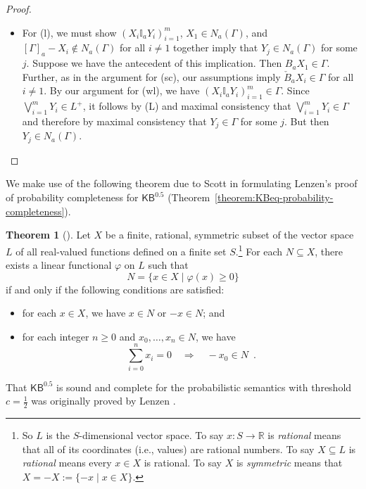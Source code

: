 \documentclass[12pt]{article}
\theoremstyle{definition}
\newtheorem{theorem}{Theorem}[section]
\newcommand{\KBeq}{{\mathsf{KB}^{\mathsf{0.5}}}}       %
\begin{document}
\begin{proof}
\begin{itemize}
  \item For (l), we must show $(X_i\mathbb{I}_aY_i)_{i=1}^m$,
    $X_1\in N_a(\Gamma)$, and $[\Gamma]_a-X_i\notin N_a(\Gamma)$
    for all $i\neq 1$ together imply that $Y_j\in N_a(\Gamma)$
    for some $j$.  Suppose we have the antecedent of this implication.
    Then $B_aX_1\in\Gamma$.  Further, as in the argument for (sc), our
    assumptions imply $\check B_aX_i\in\Gamma$ for all $i\neq 1$.
    By our argument for (wl), we have $(X_i\mathbb{I}_aY_i)_{i=1}^m\in\Gamma$.
    Since $\bigvee_{i=1}^mY_i\in L^+$, it follows by (L) and maximal consistency
    that $\bigvee_{i=1}^mY_i\in\Gamma$ and therefore by maximal consistency
    that $Y_j\in\Gamma$ for some $j$.  But then $Y_j\in N_a(\Gamma)$.
    \qedhere
  \end{itemize}
\end{proof}

We make use of the following theorem due to Scott \cite{Sco64:JMP} in
formulating Lenzen's proof of probability completeness for $\KBeq$
(Theorem~\ref{theorem:KBeq-probability-completeness}).

\begin{theorem}[{\cite[Theorem 1.2]{Sco64:JMP}}]
  Let $X$ be a finite, rational, symmetric subset of
  the vector space $L$ of all real-valued functions defined on a finite set 
  $S$.\footnote{So $L$ is the $S$-dimensional vector space.
  To say $x:S\to\mathbb{R}$ is \emph{rational} means that all of its
  coordinates (i.e., values) are rational numbers.  
  To say $X\subseteq L$ is \emph{rational} means every $x\in X$ is rational.
  To say $X$ is \emph{symmetric} means that $X=-X:=\{-x\mid x\in X\}$.}
  For each $N\subseteq X$,
  there exists a linear functional $\varphi$ on $L$ such that
  \[
  N = \{x\in X\mid \varphi(x)\geq 0\}
  \]
  if and only if the following conditions are satisfied:
  \begin{itemize}
  \item for each $x\in X$, we have $x\in N$ or $-x\in N$; and

  \item for each integer $n\geq 0$ and $x_0,\dots,x_n\in N$, we have
  \[
  \sum_{i=0}^n x_i = 0
  \quad\Rightarrow\quad
  -x_0\in N\enspace.
  \]
  \end{itemize}
\end{theorem}

That $\KBeq$ is sound and complete for the probabilistic semantics
with threshold $c=\frac 12$ was originally proved by Lenzen
\cite{Lenzen1980:gwuw}.
\end{document}
